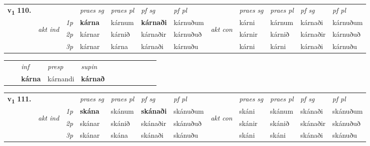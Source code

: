 \begin{tabular}{llllllllllll} \toprule
\multirow{4}{*}{{{\textbf{v{\textsubscript{1}}} \Large{\textbf{110.}}}}}  & &   &  \textit{praes sg}  & \textit{praes pl}  &\textit{ pf sg} & \textit{pf pl} &  &  \textit{praes sg}  & \textit{praes pl}  & \textit{pf sg} & \textit{pf pl } \\*
	\cmidrule{4-7} \cmidrule{9-12}
 & \multirow{3}{*}{\begin{turn}{90}\textit{akt ind}\end{turn}} & {\textit{1p}} & \textbf{kárna} & kárnum    & \textbf{kárnaði} & kárnuðum & \multirow{3}{*}{\begin{turn}{90}\textit{akt con}\end{turn}} &kárni & kárnum & kárnaði & kárnuðum\\*
& &  {\textit{2p}} &  kárnar  & kárnið   & kárnaðir & kárnuðuð & & kárnir & kárnið & kárnaðir & kárnuðuð \\*
& &  {\textit{3p}} & kárnar & kárna   & kárnaði & kárnuðu & & kárni & kárni& kárnaði & kárnuðu  \\*
\cmidrule{4-7} \cmidrule{9-12}
\end{tabular}


\begin{tabular}{llllllllllll}
 & & \textit{inf}     & \textit{presp} & \textit{supin}       \\*
  & & \textbf{kárna}      & kárnandi &  \textbf{kárnað}   \\*
\cmidrule{1-12}
\end{tabular}



\begin{tabular}{llllllllllll} \toprule
\multirow{4}{*}{{{\textbf{v{\textsubscript{1}}} \Large{\textbf{111.}}}}}  & &   &  \textit{praes sg}  & \textit{praes pl}  &\textit{ pf sg} & \textit{pf pl} &  &  \textit{praes sg}  & \textit{praes pl}  & \textit{pf sg} & \textit{pf pl } \\*
	\cmidrule{4-7} \cmidrule{9-12}
 & \multirow{3}{*}{\begin{turn}{90}\textit{akt ind}\end{turn}} & {\textit{1p}} & \textbf{skána} & skánum    & \textbf{skánaði} & skánuðum & \multirow{3}{*}{\begin{turn}{90}\textit{akt con}\end{turn}} &skáni & skánum & skánaði & skánuðum\\*
& &  {\textit{2p}} &  skánar  & skánið   & skánaðir & skánuðuð & & skánir & skánið & skánaðir & skánuðuð \\*
& &  {\textit{3p}} & skánar & skána   & skánaði & skánuðu & & skáni & skáni& skánaði & skánuðu  \\*
\cmidrule{4-7} \cmidrule{9-12}
\end{tabular}


